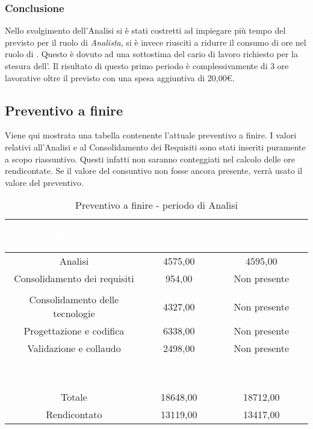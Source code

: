 \subsubsection{Conclusione}
Nello svolgimento dell'Analisi si è stati costretti ad impiegare più tempo del previsto per il ruolo di \textit{Analista}, si è invece riusciti a ridurre il consumo di ore nel ruolo di \Amministratore. Questo è dovuto ad una sottostima del cario di lavoro richiesto per la stesura dell'\AdRv{}. Il risultato di questo primo periodo è complessivamente di 3 ore lavorative oltre il previsto con una spesa aggiuntiva di 20,00€.
\subsection{Preventivo a finire}
Viene qui mostrata una tabella contenente l'attuale preventivo a finire. I valori relativi all'Analisi e al Consolidamento dei Requisiti sono stati inseriti puramente a scopo riassuntivo. Questi infatti non saranno conteggiati nel calcolo delle ore rendicontate. Se il valore del consuntivo non fosse ancora presente, verrà usato il valore del preventivo.
\begin{table}[H]
	\centering
	\begin{tabular}{|c|c|c|}
	\rowcolor{darkblue} 
		\textcolor{white}{Periodo}	&\textcolor{white}{Preventivo €}	&	\textcolor{white}{Consuntivo €} \\ \hline
		Analisi					&	4575,00				&	4595,00  \\ \hline
		Consolidamento dei requisiti	&	954,00				&	Non presente  \\ \hline
		\rowcolor{darkblue} \multicolumn{3}{|c|}{\textcolor{white}{Rendicontato}}  \\ \hline
		Consolidamento delle tecnologie	&	4327,00				&	Non presente  \\ \hline
		Progettazione e codifica		&	6338,00				&	Non presente  \\ \hline
		Validazione e collaudo		&	2498,00				&	Non presente  \\ \hline
		\rowcolor{darkblue}		&\textcolor{white}{Preventivo €}	&	\textcolor{white}{Preventivo a finire €} \\ \hline
		Totale					&	18648,00				&	18712,00 \\ \hline
		Rendicontato			&	13119,00				&	13417,00 \\ \hline
	\end{tabular}
	\caption{Preventivo a finire - periodo di Analisi}
\end{table}